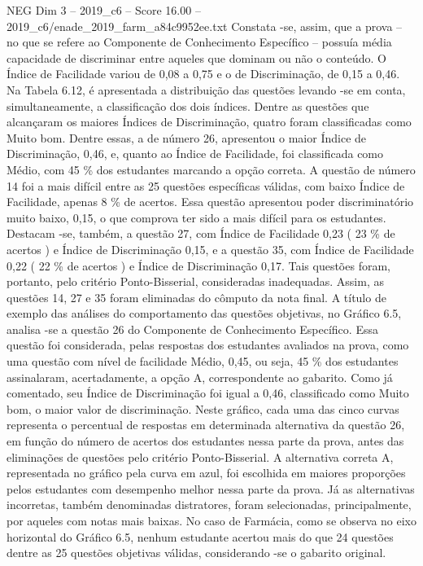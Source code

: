 \begin{textsample}{NEG Dim 3 – 2019\_c6 – Score 16.00 – 2019\_c6/enade\_2019\_farm\_a84c9952ee.txt}
Constata -se, assim, que a prova – no que se refere ao Componente de Conhecimento Específico – possuía média capacidade de discriminar entre aqueles que dominam ou não o conteúdo.
O Índice de Facilidade variou de 0,08 a 0,75 e o de Discriminação, de 0,15 a 0,46.
Na Tabela 6.12, é apresentada a distribuição das questões levando -se em conta, simultaneamente, a classificação dos dois índices.
Dentre as questões que alcançaram os maiores Índices de Discriminação, quatro foram classificadas como Muito bom.
Dentre essas, a de número 26, apresentou o maior Índice de Discriminação, 0,46, e, quanto ao Índice de Facilidade, foi classificada como Médio, com 45 \% dos estudantes marcando a opção correta.
A questão de número 14 foi a mais difícil entre as 25 questões específicas válidas, com baixo Índice de Facilidade, apenas 8 \% de acertos.
Essa questão apresentou poder discriminatório muito baixo, 0,15, o que comprova ter sido a mais difícil para os estudantes.
Destacam -se, também, a questão 27, com Índice de Facilidade 0,23 ( 23 \% de acertos ) e Índice de Discriminação 0,15, e a questão 35, com Índice de Facilidade 0,22 ( 22 \% de acertos ) e Índice de Discriminação 0,17.
Tais questões foram, portanto, pelo critério Ponto-Bisserial, consideradas inadequadas.
Assim, as questões 14, 27 e 35 foram eliminadas do cômputo da nota final.
A título de exemplo das análises do comportamento das questões objetivas, no Gráfico 6.5, analisa -se a questão 26 do Componente de Conhecimento Específico.
Essa questão foi considerada, pelas respostas dos estudantes avaliados na prova, como uma questão com nível de facilidade Médio, 0,45, ou seja, 45 \% dos estudantes assinalaram, acertadamente, a opção A, correspondente ao gabarito.
Como já comentado, seu Índice de Discriminação foi igual a 0,46, classificado como Muito bom, o maior valor de discriminação.
Neste gráfico, cada uma das cinco curvas representa o percentual de respostas em determinada alternativa da questão 26, em função do número de acertos dos estudantes nessa parte da prova, antes das eliminações de questões pelo critério Ponto-Bisserial.
A alternativa correta A, representada no gráfico pela curva em azul, foi escolhida em maiores proporções pelos estudantes com desempenho melhor nessa parte da prova.
Já as alternativas incorretas, também denominadas distratores, foram selecionadas, principalmente, por aqueles com notas mais baixas.
No caso de Farmácia, como se observa no eixo horizontal do Gráfico 6.5, nenhum estudante acertou mais do que 24 questões dentre as 25 questões objetivas válidas, considerando -se o gabarito original.

\end{textsample}

